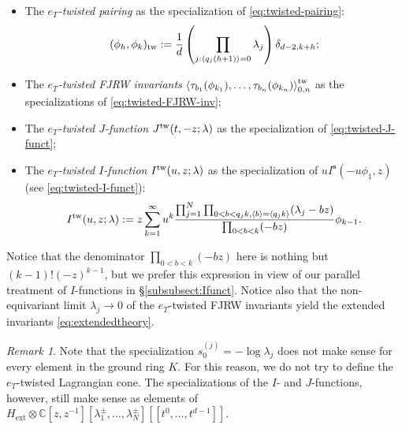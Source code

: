 \documentclass[11pt]{amsart}
\theoremstyle{definition} %
\theoremstyle{remark} %
\newtheorem{rem}[thm]{Remark}%
\newtheorem{notn}[thm]{Notation}%
\newcommand{\CC}{\mathbb C}
\newcommand{\tw}{{\rm tw}}
\def\corr#1{\left\langle #1 \right\rangle}
\def\fracp#1{\left\langle #1 \right\rangle}
\newcommand{\bs}{\mathbf{s}}
\newcommand{\ext}{{\operatorname{ext}}}
\newcommand{\FJRW}{{\operatorname{FJRW}}}
\begin{document}
\begin{itemize} 
\item The \emph{$e_T$-twisted pairing} as 
the specialization of \eqref{eq:twisted-pairing}: 
\[
(\phi_h,\phi_k)_{\tw} := \frac{1}{d} 
\left( \prod_{j:\fracp{q_j(h+1)}=0} 
\lambda_j  \right) \delta_{d-2, k+h}; 
\]

\item The \emph{$e_T$-twisted FJRW invariants} 
$\corr{\tau_{b_1}(\phi_{k_1}),\dots,\tau_{b_n}(\phi_{k_n})
}_{0,n}^{\tw}$ as the specializations 
of \eqref{eq:twisted-FJRW-inv}; 

\item The \emph{$e_T$-twisted $J$-function} 
$J^\tw(t,-z;\lambda)$ 
as the specialization of \eqref{eq:twisted-J-funct};  

\item The \emph{$e_T$-twisted $I$-function} 
$I^\tw(u,z;\lambda)$ 
as the specialization of $u I^\bs(-u\phi_1,z)$ 
(see \eqref{eq:twisted-I-funct}):   
\begin{equation} 
\label{eq:FJRW-Ifunction}
I^\tw(u,z;\lambda) : = 
z \sum_{k=1}^{\infty} u^{k} 
\frac{\prod_{j=1}^N \prod_{0<b<q_j k, \fracp{b} = \fracp{q_jk}} 
(\lambda_j-bz)} 
{\prod_{0<b<k} (-bz)} 
\phi_{k-1}. 
\end{equation} 
\end{itemize} 
Notice that the denominator $\prod_{0<b<k}(-bz)$ here is 
nothing but $(k-1)!(-z)^{k-1}$, but we prefer this expression in view of 
our parallel treatment of $I$-functions in \S\ref{subsubsect:Ifunct}. 
Notice also that the non-equivariant limit $\lambda_j \to 0$ 
of the $e_T$-twisted FJRW invariants yield the 
extended invariants \eqref{eq:extendedtheory}. 




\begin{rem} 
\label{rem:loglambda} 
Note that the specialization $s_0^{(j)} = -\log \lambda_j$ 
does not make sense for every element in the ground ring $K$. 
For this reason, we do not try to define 
the $e_T$-twisted Lagrangian cone. 
The specializations of the $I$- and $J$-functions, 
however, still make sense as elements of 
$H_\ext \otimes \CC[z,z^{-1}]
[\lambda_1^\pm,\dots,\lambda_N^\pm]
[\![t^0,\dots,t^{d-1}]\!]$. 
\end{rem} 
 
\end{document}
